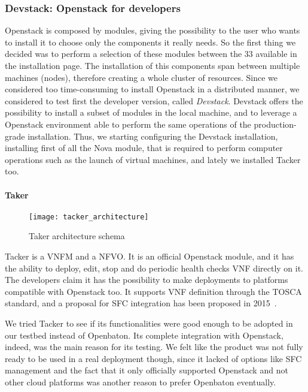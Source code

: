 \subsubsection{Devstack: Openstack for developers}
Openstack is composed by modules, giving the possibility to the user who wants 
to install it to choose only the components it really needs. So the first thing 
we decided was to perform a selection of these modules between the 33 available 
in the installation page. The installation of this components span between 
multiple machines (nodes), therefore creating a whole cluster of resources. 
Since we considered too time-consuming to install Openstack in a distributed 
manner, we considered to test first the developer version, called 
\emph{Devstack}. Devstack offers the possibility to install a subset of modules 
in the local machine, and to leverage a Openstack environment able to perform 
the same operations of the production-grade installation. Thus, we starting 
configuring the Devstack installation, installing first of all the Nova 
module, that is required to perform computer operations such as the launch of 
virtual machines, and lately we installed Tacker too.

\paragraph*{Taker}
\begin{figure}[t]
  \centering
  \texttt{[image: tacker\_architecture]}
  \caption[Taker architecture schema]{Taker architecture
    schema~\cite{tackerOpenstackwiki}}
\end{figure}
Tacker is a VNFM and a NFVO. It is an official Openstack module, and it has the
ability to deploy, edit, stop and do periodic health checks VNF directly on it.
The developers claim it has the possibility to make deployments to platforms
compatible with Openstack too. It supports VNF definition through the TOSCA
standard, and a proposal for SFC integration has been proposed in
2015~\cite{tackerOpenstackwiki}.

We tried Tacker to see if its functionalities were good enough to be
adopted in our testbed instead of Openbaton. Its complete integration with
Openstack, indeed, was the main reason for its testing. We felt like the product
was not fully ready to be used in a real deployment though, since it lacked of
options like SFC management and the fact that it only officially supported
Openstack and not other cloud platforms was another reason to prefer Openbaton
eventually.

